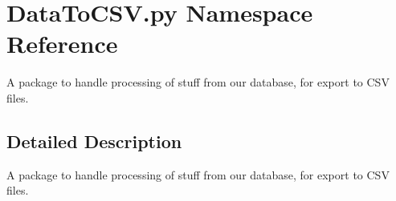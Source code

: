 \hypertarget{namespace_data_to_c_s_v_1_1py}{}\section{Data\+To\+C\+S\+V.\+py Namespace Reference}
\label{namespace_data_to_c_s_v_1_1py}


A package to handle processing of stuff from our database, for export to C\+SV files.  




\subsection{Detailed Description}
A package to handle processing of stuff from our database, for export to C\+SV files. 

